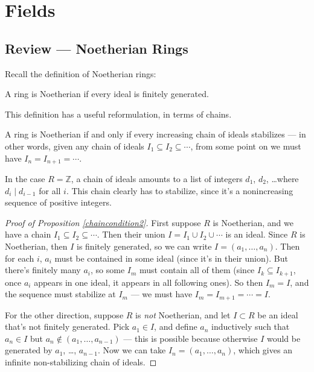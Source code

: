 
\section{Fields}

\subsection{Review --- Noetherian Rings}

Recall the definition of Noetherian rings:

\begin{definition}
    A ring is Noetherian if every ideal is finitely generated. 
\end{definition}

This definition has a useful reformulation, in terms of chains.

\begin{proposition} \label{chaincondition2}
    A ring is Noetherian if and only if every increasing chain of ideals stabilizes --- in other words, given any chain of ideals $I_1 \subseteq I_2 \subseteq \cdots$, from some point on we must have $I_n = I_{n + 1} = \cdots$. 
\end{proposition}

\begin{example}
    In the case $R = \mathbb{Z}$, a chain of ideals amounts to a list of integers $d_1$, $d_2$, \ldots where $d_i \mid d_{i - 1}$ for all $i$. This chain clearly has to stabilize, since it's a nonincreasing sequence of positive integers. 
\end{example}

\begin{proof}[Proof of Proposition \ref{chaincondition2}]
    First suppose $R$ is Noetherian, and we have a chain $I_1 \subseteq I_2 \subseteq \cdots$. Then their union $I = I_1 \cup I_2 \cup \cdots$ is an ideal. Since $R$ is Noetherian, then $I$ is finitely generated, so we can write $I = (a_1, \ldots, a_n)$. Then for each $i$, $a_i$ must be contained in some ideal (since it's in their union). But there's finitely many $a_i$, so some $I_m$ must contain all of them (since $I_k \subseteq I_{k + 1}$, once $a_i$ appears in one ideal, it appears in all following ones). So then $I_m = I$, and the sequence must stabilize at $I_m$ --- we must have $I_m = I_{m + 1} = \cdots = I$. 

    For the other direction, suppose $R$ is \emph{not} Noetherian, and let $I \subset R$ be an ideal that's not finitely generated. Pick $a_1 \in I$, and define $a_n$ inductively such that $a_n \in I$ but $a_n\not\in (a_1, \ldots, a_{n - 1})$ --- this is possible because otherwise $I$ would be generated by $a_1$, \ldots, $a_{n - 1}$. Now we can take $I_n = (a_1, \ldots, a_n)$, which gives an infinite non-stabilizing chain of ideals. 
\end{proof}

